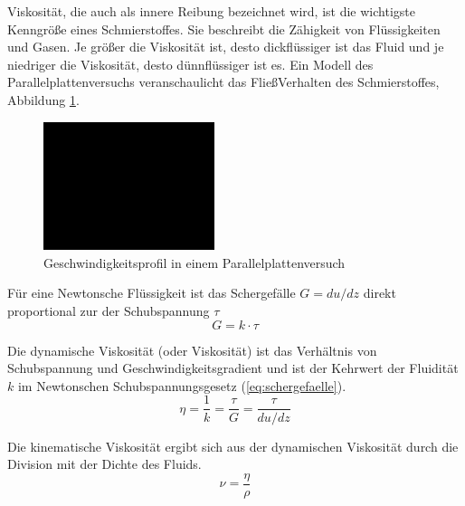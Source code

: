 Viskosität, die auch als innere Reibung bezeichnet wird, ist die wichtigste Kenngröße eines Schmierstoffes.
Sie beschreibt die Zähigkeit von Flüssigkeiten und Gasen.
Je größer die Viskosität ist, desto dickflüssiger ist das Fluid und je niedriger die Viskosität, desto dünnflüssiger ist es.
Ein Modell des Parallelplattenversuchs veranschaulicht das FließVerhalten des Schmierstoffes, Abbildung \ref{fig:geschwindigkeitsprofil_parallelplattenversuch}.
\begin{figure}[htb]
    \centering
    \includegraphics[width=5cm]{./images/blank_img.jpg}
    \caption{Geschwindigkeitsprofil in einem Parallelplattenversuch}
    \label{fig:geschwindigkeitsprofil_parallelplattenversuch}
\end{figure}

Für eine Newtonsche Flüssigkeit ist das Schergefälle $G = du/dz$ direkt proportional zur der Schubspannung $\tau$
\begin{equation}
    G = k \cdot \tau
    \label{eq:schergefaelle}
\end{equation}

Die dynamische Viskosität (oder Viskosität) ist das Verhältnis von Schubspannung und Geschwindigkeitsgradient und ist der Kehrwert der Fluidität $k$ im Newtonschen Schubspannungsgesetz (\ref{eq:schergefaelle}).
\begin{equation}
    \eta = \frac{1}{k} = \frac{\tau}{G} = \frac{\tau}{du/dz}
    \label{eq:dynamische_viskositaet}
\end{equation}

Die kinematische Viskosität ergibt sich aus der dynamischen Viskosität durch die Division mit der Dichte des Fluids.
\begin{equation}
    \nu = \frac{\eta}{\rho}
    \label{eq:kinematische_viskotitaet}
\end{equation}

